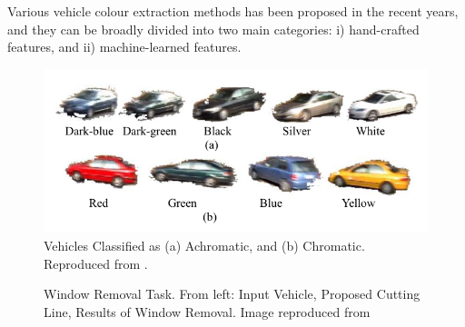 Various vehicle colour extraction methods has been proposed in the recent
years, and they can be broadly divided into two main categories:
i) hand-crafted features, and ii) machine-learned features. 

\begin{figure}[hbt!]
 \centering
 \includegraphics[width=.8\textwidth]{image/lit/carscolors.png}
 \caption[Colour Appearance Categories of Vehicle Used for Colour
 Classification]{Vehicles Classified as (a) Achromatic, and 
 (b) Chromatic. Reproduced from .}
\label{fig:sevenclasses}
\end{figure}

\begin{figure}[!htb]
 \centering {}
 \caption[Window Removal Task. From left: Input
Vehicle, Proposed Cutting Line, Results of Window Removal]{Window Removal Task.
From left: Input Vehicle, Proposed Cutting Line, Results of Window Removal.
Image reproduced from 
 \label{fig:windowremoval}}
\end{figure}

